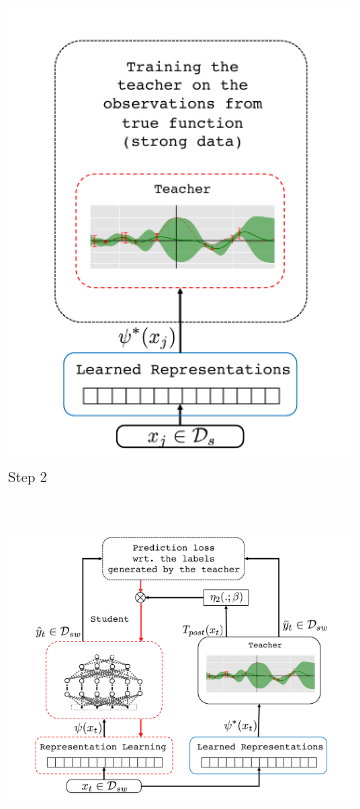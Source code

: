 \begin{figure}[!t]
{\begin{subfigure}[t]{0.25\textwidth}
        \includegraphics[width=\textwidth]{03-part-02/chapter-05/figs_and_tables/fig_fwl_step_2.pdf}
        \caption{\label{fig:step2}Step 2}
    \end{subfigure}%
     ~
    \begin{subfigure}[t]{0.425\textwidth}
        \centering
        \includegraphics[width=\textwidth]{03-part-02/chapter-05/figs_and_tables/fig_fwl_step_3.pdf}

\end{subfigure}}
\end{figure}
